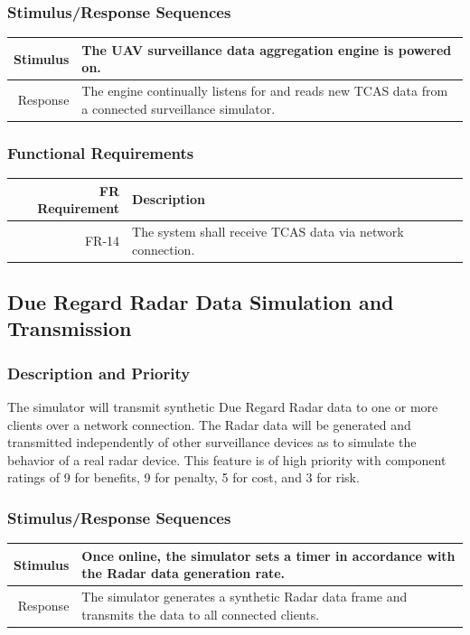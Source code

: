 \documentclass[12pt,oneside,letterpaper]{article}
\begin{document}
\subsubsection{Stimulus/Response Sequences}
\begin{longtable}{|r|p{3.8in}|}
\hline
Stimulus & The UAV surveillance data aggregation engine is powered on. \\
\hline
Response & The engine continually listens for and reads new TCAS data from a connected surveillance simulator. \\
\hline
\end{longtable}
\subsubsection{Functional Requirements}
\begin{longtable}{|r|p{3.8in}|}
\hline
FR Requirement & Description \\
\hline
FR-14 & The system shall receive TCAS data via network connection. \\
\hline
\end{longtable}

\subsection{Due Regard Radar Data Simulation and Transmission}
\subsubsection{Description and Priority}
The simulator will transmit synthetic Due Regard Radar data to one or more clients over a network connection. The Radar data will be generated and transmitted independently of other surveillance devices as to simulate the behavior of a real radar device. This feature is of high priority with component ratings of 9 for benefits, 9 for penalty, 5 for cost, and 3 for risk.
\subsubsection{Stimulus/Response Sequences}
\begin{longtable}{|r|p{3.8in}|}
\hline
Stimulus & Once online, the simulator sets a timer in accordance with the Radar data generation rate. \\
\hline
Response & The simulator generates a synthetic Radar data frame and transmits the data to all connected clients. \\
\hline
\end{longtable}
\end{document}

